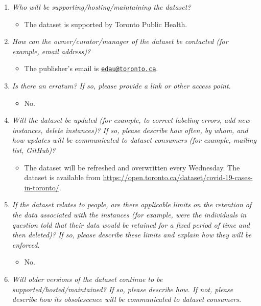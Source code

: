 \documentclass[
]{article}
\providecommand{\tightlist}{%
  \setlength{\itemsep}{0pt}\setlength{\parskip}{0pt}}
\begin{document}
\begin{enumerate}
\def\labelenumi{\arabic{enumi}.}
\tightlist
\item
  \emph{Who will be supporting/hosting/maintaining the dataset?}

  \begin{itemize}
  \tightlist
  \item
    The dataset is supported by Toronto Public Health.
  \end{itemize}
\item
  \emph{How can the owner/curator/manager of the dataset be contacted (for example, email address)?}

  \begin{itemize}
  \tightlist
  \item
    The publisher's email is \href{mailto:edau@toronto.ca}{\nolinkurl{edau@toronto.ca}}.
  \end{itemize}
\item
  \emph{Is there an erratum? If so, please provide a link or other access point.}

  \begin{itemize}
  \tightlist
  \item
    No.
  \end{itemize}
\item
  \emph{Will the dataset be updated (for example, to correct labeling errors, add new instances, delete instances)? If so, please describe how often, by whom, and how updates will be communicated to dataset consumers (for example, mailing list, GitHub)?}

  \begin{itemize}
  \tightlist
  \item
    The dataset will be refreshed and overwritten every Wednesday. The dataset is available from \url{https://open.toronto.ca/dataset/covid-19-cases-in-toronto/}.
  \end{itemize}
\item
  \emph{If the dataset relates to people, are there applicable limits on the retention of the data associated with the instances (for example, were the individuals in question told that their data would be retained for a fixed period of time and then deleted)? If so, please describe these limits and explain how they will be enforced.}

  \begin{itemize}
  \tightlist
  \item
    No.
  \end{itemize}
\item
  \emph{Will older versions of the dataset continue to be supported/hosted/maintained? If so, please describe how. If not, please describe how its obsolescence will be communicated to dataset consumers.}


\end{enumerate}
\end{document}
